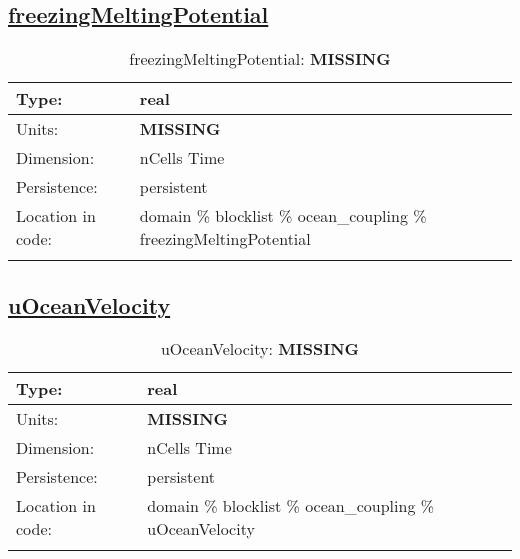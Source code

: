 \subsection[freezingMeltingPotential]{\hyperref[sec:var_tab_ocean_coupling]{freezingMeltingPotential}}
\label{subsec:var_sec_ocean_coupling_freezingMeltingPotential}
\begin{center}
\begin{longtable}{| p{2.0in} | p{4.0in} |}
        \hline 
        Type: & real \\
        \hline 
        Units: & {\bf \color{red} MISSING} \\
        \hline 
        Dimension: & nCells Time \\
        \hline 
        Persistence: & persistent \\
        \hline 
         Location in code: & domain \% blocklist \% ocean\_coupling \% freezingMeltingPotential \\
         \hline 
    \caption{freezingMeltingPotential: {\bf \color{red} MISSING}}
\end{longtable}
\end{center}
\subsection[uOceanVelocity]{\hyperref[sec:var_tab_ocean_coupling]{uOceanVelocity}}
\label{subsec:var_sec_ocean_coupling_uOceanVelocity}
\begin{center}
\begin{longtable}{| p{2.0in} | p{4.0in} |}
        \hline 
        Type: & real \\
        \hline 
        Units: & {\bf \color{red} MISSING} \\
        \hline 
        Dimension: & nCells Time \\
        \hline 
        Persistence: & persistent \\
        \hline 
         Location in code: & domain \% blocklist \% ocean\_coupling \% uOceanVelocity \\
         \hline 
    \caption{uOceanVelocity: {\bf \color{red} MISSING}}
\end{longtable}
\end{center}

